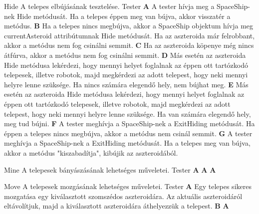 \documentclass[../../projlab]{subfiles}
\begin{document}
\begin{use-case}
    {Hide}
    {A telepes elbújásának tesztelése.}
    {Tester} 
    \textbf{A} A tester hívja meg a SpaceShip-nek Hide metódusát. Ha a telepes éppen meg van bújva, akkor visszatér a metódus. \newline
    \textbf{B} Ha a telepes nincs megbújva, akkor a SpaceShip objektum hívja meg currentAsteroid attribútumnak Hide metódusát. Ha az aszteroida már felrobbant, akkor a metódus nem fog csinálni semmit. \newline
    \textbf{C} Ha az aszteroida köpenye még nincs átfúrva, akkor a metódus nem fog csinálni semmit. \newline
    \textbf{D} Más esetén az aszteroida Hide metódusa lekérdezi, hogy mennyi helyet foglalnak az éppen ott tartózkodó telepesek, illetve robotok, majd megkérdezi az adott telepest, hogy neki mennyi helyre lenne szüksége. Ha nincs számára elegendő hely, nem bújhat meg.    \newline
    \textbf{E} Más esetén az aszteroida Hide metódusa lekérdezi, hogy mennyi helyet foglalnak az éppen ott tartózkodó telepesek, illetve robotok, majd megkérdezi az adott telepest, hogy neki mennyi helyre lenne szüksége. Ha van számára elegendő hely, meg tud bújni.    \newline
    \textbf{F} A tester meghívja a SpaceShip-nek a ExitHiding metódusát. Ha éppen a telepes nincs megbújva, akkor a metódus nem csinál semmit. \newline
    \textbf{G} A tester meghívja a SpaceShip-nek a ExitHiding metódusát. Ha a telepes meg van bújva, akkor a metódus "kiszabadítja", kibújik az aszteroidából. \newline \newline
\end{use-case}

\begin{use-case}
    {Mine}
    {A telepesek bányászásának lehetséges műveletei. }
    {Tester} 
    \textbf{A}  \newline
    \textbf{A}  \newline
    \textbf{A}  \newline
\end{use-case}

\begin{use-case}
    {Move}
    {A telepesek mozgásának lehetséges műveletei. }
    {Tester} 
    \textbf{A}  Egy telepes sikeres mozgatása egy kiválasztott szomszédos aszteroidára. Az aktuális aszteroidáról eltávolítjuk, majd a kiválasztott aszteroidára áthelyezzük a telepest.\newline
    \textbf{B}  \newline
    \textbf{A}  \newline
\end{use-case}
\end{document}
